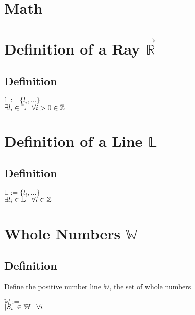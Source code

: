 \documentclass[11pt]{article}
\begin{document}
\section*{Math}





\section{Definition of a Ray  $\vec{\mathbb{R}}$}
\subsection{Definition}
\begin{center}
$\mathbb{L} := \{l_i,...\}$
\\ \vspace{2mm}
$\exists l_i \in \mathbb{L} \hspace{3mm} \forall i > 0 \in \mathbb{Z}$
\end{center}

\section{Definition of a Line $\mathbb{L}$}
\subsection{Definition}
\begin{center}
$\mathbb{L} := \{l_i,...\}$
\\ \vspace{2mm}
$\exists l_i \in \mathbb{L} \hspace{3mm} \forall i \in \mathbb{Z}$
\end{center}




\section{Whole Numbers $\mathbb{W}$}
\subsection{Definition}
Define the positive number line $\mathbb{W}$, the set of whole numbers
\begin{center}
$\mathbb{W} :=$
\\ \vspace{2mm}
$|S_i| \in \mathbb{W} \hspace{3mm} \forall i$
\end{center}
\end{document}
